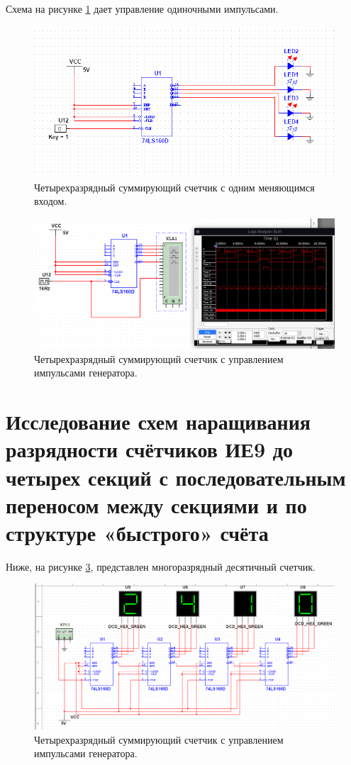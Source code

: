 Схема на рисунке \ref{sc9} дает управление одиночными импульсами.

\begin{figure}[ht]
    \centering
    \includegraphics[width=\linewidth]{img/sc9.png}
    \caption{Четырехразрядный суммирующий счетчик с одним меняющимся входом.}
    \label{sc9}
\end{figure}

\begin{figure}[ht]
    \centering
    \includegraphics[width=\linewidth]{img/sc10.png}
    \caption{Четырехразрядный суммирующий счетчик с управлением импульсами генератора.}
    \label{sc10}
\end{figure}

\clearpage

\section{Исследование схем наращивания разрядности счётчиков ИЕ9 до четырех секций с последовательным переносом между секциями и по структуре «быстрого» счёта}

Ниже, на рисунке \ref{sc11}, представлен многоразрядный десятичный счетчик.

\begin{figure}[ht]
    \centering
    \includegraphics[width=\linewidth]{img/sc11.png}
    \caption{Четырехразрядный суммирующий счетчик с управлением импульсами генератора.}
    \label{sc11}
\end{figure}
